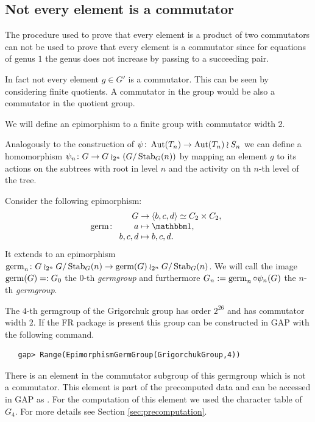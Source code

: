 \documentclass[a4paper,11pt]{amsart}
\begin{document}
\subsection{Not every element is a commutator}
The procedure used to prove that every element is a product of two commutators 
can not be used to prove that every element is a
commutator since for equations of genus $1$ the 
genus does not increase by passing to a succeeding pair. 

In fact not every element $g\in G'$ is a commutator. This can be seen by
considering finite quotients. A commutator in the group would be also a
commutator in the quotient group. 

We will define an epimorphism to a finite group with commutator width $2$.

Analogously to the construction of $\psi\colon \operatorname{{Aut}}(T_n )\to \operatorname{{Aut}}(T_n) \wr S_n$
we can define a homomorphism $\psi_n\colon G \to G\wr_{2^n}({G/\operatorname{Stab}_G(n)})$ by
mapping an element $g$ to its actions on the subtrees with root in level $n$
and the activity on th $n$-th level of the tree.

Consider the following epimorphism:
\begin{align*}
  \germ\colon\begin{array}{r@{\;}l}
               G&\to\left<b,c,d\right>\simeq C_2\times C_2, \\
               a&\mapsto\id,\\
               b,c,d&\mapsto b,c,d.
             \end{array}
\end{align*}
It extends to an epimorphism
$\operatorname{germ}_n\colon G\wr_{2^n} {G/\operatorname{Stab}_G(n)}\to \operatorname{germ}(G)\wr_{2^n}
{G/\operatorname{Stab}_G(n)}$.  We will call the image $\operatorname{germ}(G)=:G_0$ the
$0$-th \emph{germgroup} and furthermore
$G_n := \operatorname{germ}_n \circ \psi_n(G)$ the $n$-th \emph{germgroup}.

The $4$-th germgroup of the Grigorchuk group has order $2^{26}$ and has commutator width $2$.
If the FR package is present this group can be constructed in GAP with 
the following command. 
\begin{lstlisting}
   gap> Range(EpimorphismGermGroup(GrigorchukGroup,4))
\end{lstlisting}
There is an element in the commutator subgroup of this germgroup which
is not a commutator. This element is part of the precomputed data and
can be accessed in GAP as . For the
computation of this element we used the character table of $G_4$. For more
details see Section \ref{sec:precomputation}.
\end{document}
